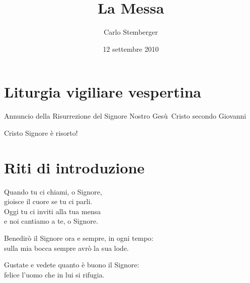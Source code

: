 \documentclass[leaflet,rite=ambrosian,litcolor=red]{missa}
\title{La Messa}
\author{Carlo Stemberger}
\date{12 settembre 2010} %
\newcommand{\TODO}{\makecolorbox{green}{\textcolor{red}{TODO}}}
\begin{document}


\section{Liturgia vigiliare vespertina}
\par\TODO

Annuncio della Risurrezione del Signore Nostro Gesù~Cristo secondo Giovanni

\gospel[Sat]

Cristo Signore è risorto!

\all{\tbtg[!]}

\section{Riti di introduzione}

\begin{refrain}
Quando tu ci chiami, o Signore,\\
gioisce il cuore se tu ci parli.\\
Oggi tu ci inviti alla tua mensa\\
e noi cantiamo a te, o Signore.
\end{refrain}
\begin{lyrics}
Benedirò il Signore ora e sempre, in ogni tempo:\\
sulla mia bocca sempre avrò la sua lode. \R

Gustate e vedete quanto è buono il Signore:\\
felice l'uomo che in lui si rifugia. \R
\end{lyrics}

\otherwise \hfill {}



\silence

\end{document}
